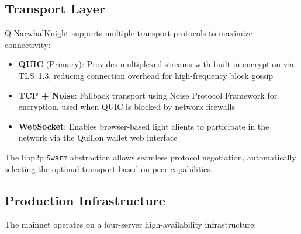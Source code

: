 \documentclass[11pt,a4paper]{article}
\begin{document}
\subsection{Transport Layer}

Q-NarwhalKnight supports multiple transport protocols to maximize connectivity:

\begin{itemize}
    \item \textbf{QUIC} (Primary): Provides multiplexed streams with built-in encryption via TLS~1.3, reducing connection overhead for high-frequency block gossip
    \item \textbf{TCP + Noise}: Fallback transport using Noise Protocol Framework for encryption, used when QUIC is blocked by network firewalls
    \item \textbf{WebSocket}: Enables browser-based light clients to participate in the network via the Quillon wallet web interface
\end{itemize}

The libp2p \texttt{Swarm} abstraction allows seamless protocol negotiation, automatically selecting the optimal transport based on peer capabilities.

\subsection{Production Infrastructure}

The mainnet operates on a four-server high-availability infrastructure:
\end{document}
